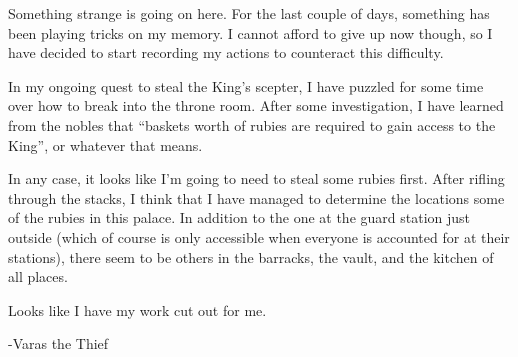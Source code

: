 \documentclass[white]{grimrock}
\begin{document}
\name{\wArchives{}}

Something strange is going on here. For the last couple of days, something has been playing tricks on my memory. I cannot afford to give up now though, so I have decided to start recording my actions to counteract this difficulty.

In my ongoing quest to steal the King's scepter, I have puzzled for some time over how to break into the throne room. After some investigation, I have learned from the nobles that ``baskets worth of rubies are required to gain access to the King'', or whatever that means.

In any case, it looks like I'm going to need to steal some rubies first. After rifling through the stacks, I think that I have managed to determine the locations some of the rubies in this palace. In addition to the one at the guard station just outside (which of course is only accessible when everyone is accounted for at their stations), there seem to be others in the barracks, the vault, and the kitchen of all places.

Looks like I have my work cut out for me.

								-Varas the Thief
\end{document}
